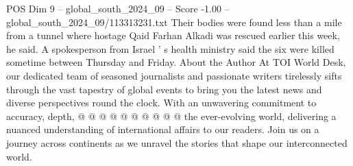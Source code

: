 \begin{textsample}{POS Dim 9 – global\_south\_2024\_09 – Score -1.00 – global\_south\_2024\_09/113313231.txt}
Their bodies were found less than a mile from a tunnel where hostage Qaid Farhan Alkadi was rescued earlier this week, he said.
A spokesperson from Israel ' s health ministry said the six were killed sometime between Thursday and Friday.
About the Author At TOI World Desk, our dedicated team of seasoned journalists and passionate writers tirelessly sifts through the vast tapestry of global events to bring you the latest news and diverse perspectives round the clock.
With an unwavering commitment to accuracy, depth, @ @ @ @ @ @ @ @ @ @ the ever-evolving world, delivering a nuanced understanding of international affairs to our readers.
Join us on a journey across continents as we unravel the stories that shape our interconnected world.

\end{textsample}
